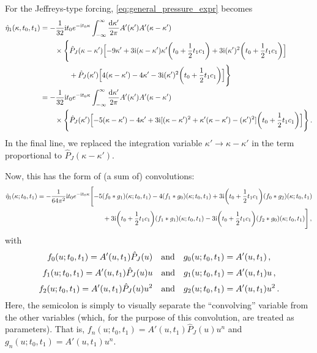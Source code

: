 \documentclass{jfm}
\newcommand{\im}{\mathrm{i}}
\begin{document}
For the Jeffreys-type forcing, \cref{eq:general_pressure_expr} becomes
\begin{align*}
  \hat{\eta}_1(\kappa,t_0,t_1) &=
  -\frac{1}{32} \im t_0 e^{-\im t_0 \kappa}
  \int_{-\infty}^{\infty} \frac{\dd{\kappa'}}{2\pi} A'(\kappa') A'(\kappa-\kappa')
  \\ &\qquad
  \times \Biggl\{
    \hat{P}_J(\kappa-\kappa')
    \Bigl[-9 \kappa' + 3 \im (\kappa - \kappa') \kappa' \pqty{t_0 +
      \frac{1}{2} t_1 c_1}
    + 3 \im (\kappa')^2 \pqty{t_0 + \frac{1}{2} t_1 c_1} \Bigr] \\
  &\qquad\qquad
    + \hat{P}_J(\kappa')
    \Bigl[4 (\kappa-\kappa') - 4\kappa'
    -3 \im (\kappa')^2 \pqty{t_0 + \frac{1}{2} t_1 c_1}\Bigr]
  \Biggr\} \\
  &= -\frac{1}{32} \im t_0 e^{-\im t_0 \kappa}
  \int_{-\infty}^{\infty} \frac{\dd{\kappa'}}{2\pi} A'(\kappa') A'(\kappa-\kappa')
  \\ &\qquad
  \times \Biggl\{
    \hat{P}_J(\kappa')
    \Bigl[-5 (\kappa-\kappa') - 4\kappa'
    +3 \im [(\kappa-\kappa')^2 + \kappa'(\kappa-\kappa') -(\kappa')^2] \pqty{t_0 + \frac{1}{2} t_1 c_1}\Bigr]
  \Biggr\}
  \,.
\end{align*}
In the final line, we replaced the integration variable $\kappa' \to
\kappa-\kappa'$ in the term proportional to $\hat{P}_J(\kappa-\kappa')$.

Now, this has the form of (a sum of) convolutions:
\begin{equation}
\begin{aligned}
  \hat{\eta}_1(\kappa;t_0,t_1) = -\frac{1}{64\pi^2} \im t_0 e^{-\im t_0
    \kappa} & \Biggl[
    -5 (f_0 * g_1)(\kappa; t_0,t_1)
    -4 (f_1 * g_0)(\kappa; t_0,t_1)
    + 3 \im \pqty{t_0 + \frac{1}{2} t_1 c_1} (f_0 * g_2)(\kappa; t_0,t_1) \\
    &\qquad
    + 3 \im \pqty{t_0 + \frac{1}{2} t_1 c_1} (f_1 * g_1)(\kappa; t_0,t_1)
    - 3 \im \pqty{t_0 + \frac{1}{2} t_1 c_1} (f_2 * g_0)(\kappa; t_0,t_1) \Biggr] \,,
\end{aligned}
\label{eq:jeffreys_fourier}
\end{equation}
with
\[
  f_0(u;t_0,t_1) = A'(u,t_1) \hat{P}_J(u) \qq{and}
  g_0(u;t_0,t_1) = A'(u,t_1) \,,
\]
\[
  f_1(u;t_0,t_1) = A'(u,t_1) \hat{P}_J(u) u \qq{and}
  g_1(u;t_0,t_1) = A'(u,t_1) u \,,
\]
\[
  f_2(u;t_0,t_1) = A'(u,t_1) \hat{P}_J(u) u^2 \qq{and}
  g_2(u;t_0,t_1) = A'(u,t_1) u^2 \,.
\]
Here, the semicolon is simply to visually separate the ``convolving''
variable from the other variables (which, for the purpose of this
convolution, are treated as parameters).
That is, $f_n(u;t_0,t_1) = A'(u,t_1) \hat{P}_J(u) u^n$ and
$g_n(u;t_0,t_1) = A'(u,t_1) u^n$.
\end{document}
